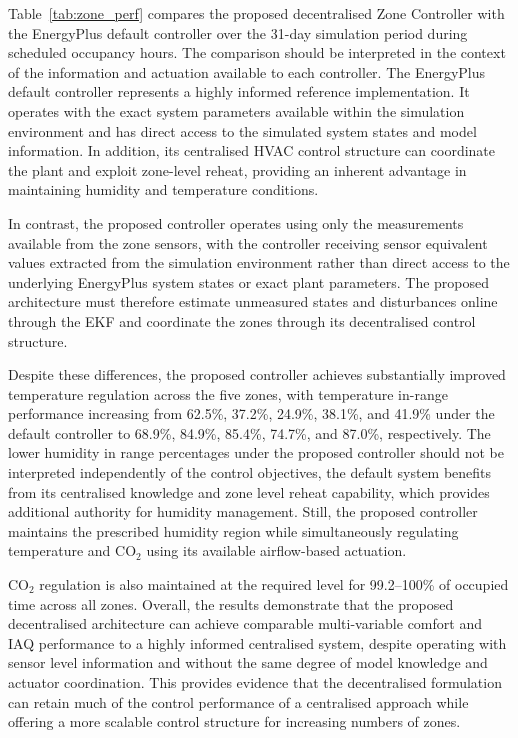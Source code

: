 \documentclass[12pt, a4paper]{article}
\begin{document}
	Table~\ref{tab:zone_perf} compares the proposed decentralised Zone Controller with the EnergyPlus default controller over the 31-day simulation period during scheduled occupancy hours. The comparison should be interpreted in the context of the information and actuation available to each controller. The EnergyPlus default controller represents a highly informed reference implementation. It operates with the exact system parameters available within the simulation environment and has direct access to the simulated system states and model information. In addition, its centralised HVAC control structure can coordinate the plant and exploit zone-level reheat, providing an inherent advantage in maintaining humidity and temperature conditions.
	
	In contrast, the proposed controller operates using only the measurements available from the zone sensors, with the controller receiving sensor equivalent values extracted from the simulation environment rather than direct access to the underlying EnergyPlus system states or exact plant parameters. The proposed architecture must therefore estimate unmeasured states and disturbances online through the EKF and coordinate the zones through its decentralised control structure.
	
	Despite these differences, the proposed controller achieves substantially improved temperature regulation across the five zones, with temperature in-range performance increasing from 62.5\%, 37.2\%, 24.9\%, 38.1\%, and 41.9\% under the default controller to 68.9\%, 84.9\%, 85.4\%, 74.7\%, and 87.0\%, respectively. The lower humidity in range percentages under the proposed controller should not be interpreted independently of the control objectives, the default system benefits from its centralised knowledge and zone level reheat capability, which provides additional authority for humidity management. Still, the proposed controller maintains the prescribed humidity region while simultaneously regulating temperature and CO$_2$ using its available airflow-based actuation.

	CO$_2$ regulation is also maintained at the required level for 99.2--100\% of occupied time across all zones. Overall, the results demonstrate that the proposed decentralised architecture can achieve comparable multi-variable comfort and IAQ performance to a highly informed centralised system, despite operating with sensor level information and without the same degree of model knowledge and actuator coordination. This provides evidence that the decentralised formulation can retain much of the control performance of a centralised approach while offering a more scalable control structure for increasing numbers of zones.
	
\end{document}
